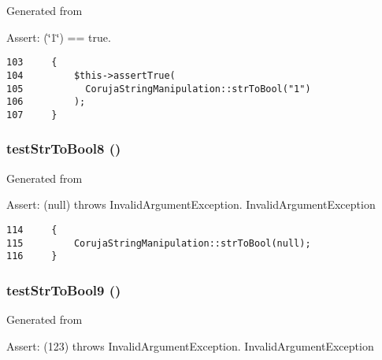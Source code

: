 Generated from \begin{Desc}
\item[Assert:](\char`\"{}1\char`\"{}) == true. \end{Desc}


\begin{Code}\begin{verbatim}103     {
104         $this->assertTrue(
105           CorujaStringManipulation::strToBool("1")
106         );
107     }
\end{verbatim}
\end{Code}


\hypertarget{class_coruja_string_manipulation_test_f5486fbb3bfa9f83b9d54f3adc759b12}{
\subsubsection[{testStrToBool8}]{\setlength{\rightskip}{0pt plus 5cm}testStrToBool8 ()}}
\label{class_coruja_string_manipulation_test_f5486fbb3bfa9f83b9d54f3adc759b12}


Generated from \begin{Desc}
\item[Assert:](null) throws InvalidArgumentException.  InvalidArgumentException \end{Desc}


\begin{Code}\begin{verbatim}114     {
115         CorujaStringManipulation::strToBool(null);
116     }
\end{verbatim}
\end{Code}


\hypertarget{class_coruja_string_manipulation_test_79af956835fa8fd185d207c90f4074d0}{
\subsubsection[{testStrToBool9}]{\setlength{\rightskip}{0pt plus 5cm}testStrToBool9 ()}}
\label{class_coruja_string_manipulation_test_79af956835fa8fd185d207c90f4074d0}


Generated from \begin{Desc}
\item[Assert:](123) throws InvalidArgumentException.  InvalidArgumentException \end{Desc}


